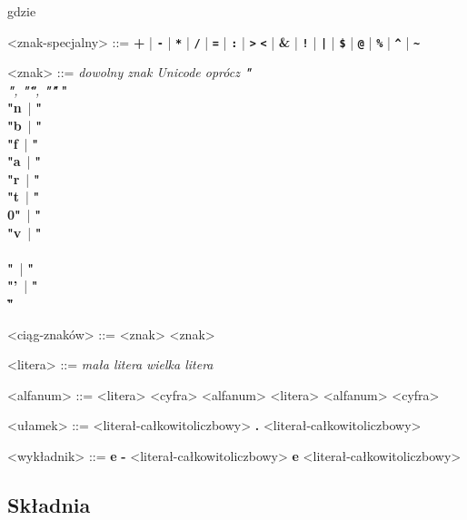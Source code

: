 \documentclass[12pt]{article}
\begin{document}
gdzie\\

\begin{grammar}

<znak-specjalny> ::=
    \textbf{+}
    | \textbf{\texttt{-}}
    | \textbf{\texttt{*}}
    | \textbf{\texttt{/}}
    | \textbf{\texttt{=}}
    | \textbf{\texttt{:}}
    | \textbf{\texttt{\textgreater}}
    \alt \textbf{\texttt{\textless}}
    | \textbf{\&}
    | \textbf{\texttt{!}}
    | \textbf{\texttt{|}}
    | \textbf{\texttt{\$}}
    | \textbf{\texttt{@}}
    | \textbf{\texttt{\%}}
    | \textbf{\texttt{\^}}
    | \textbf{\texttt{\~}}

    <znak> ::= 
        \textit{dowolny znak Unicode oprócz 
            \textbf{"\\"}, \textbf{"\""}, \textbf{"\'"}}
        \alt \textbf{"\\"n}\,
        | \textbf{"\\"b}\,
        | \textbf{"\\"f}\,
        | \textbf{"\\"a}\,
        | \textbf{"\\"r}\,
        | \textbf{"\\"t}\,
        | \textbf{"\\0"}\,
        | \textbf{"\\"v}\,
        | \textbf{"\\\\"}\,
        | \textbf{"\\"'}\,
        | \textbf{"\\\""}\,

    <ciąg-znaków> ::=
        <znak>
         <znak>
    
    <litera> ::=
        \textit{mała litera}
        \alt \textit{wielka litera}

    <alfanum> ::=
        <litera>
        \alt <cyfra>
        \alt <alfanum> <litera>
        \alt <alfanum> <cyfra>

    <ułamek> ::=
        <literał-całkowitoliczbowy> \textbf{.} <literał-całkowitoliczbowy>
    
    <wykładnik> ::=
        \textbf{e} \textbf{-} <literał-całkowitoliczbowy>
        \alt \textbf{e} <literał-całkowitoliczbowy>

\end{grammar}

\subsection{Składnia}
\end{document}
